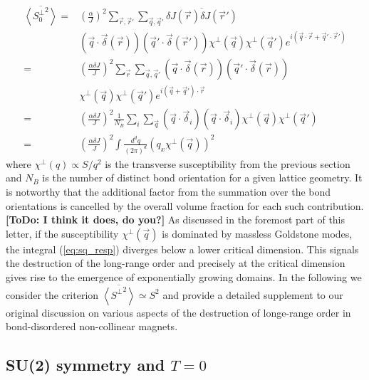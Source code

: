 \documentclass[twocolumn,english,aps,prl,floatfix]{revtex4-1}
\newcommand{\todo}[1]{{\color{red} {\bf [ToDo: #1]}}}
\begin{document}
\begin{equation}\label{eq:sq_resp}
    \begin{aligned}
        \overline{\left\langle {S_0^{\perp}}^2\right\rangle } =& 
        \left(\frac{\alpha}{J}\right)^2
        \sum_{\vec{r},\vec{r}'}\sum_{\vec{q},\vec{q}'}
        \overline{\delta J(\vec{r})\delta J(\vec{r}')} \\
        &(\vec{q}\cdot\vec{\delta}(\vec{r}))
        (\vec{q}'\cdot\vec{\delta}(\vec{r}'))
        \chi^\perp(\vec{q})\chi^\perp(\vec{q}') 
        e^{i\left(\vec{q}\cdot\vec{r}+\vec{q}'\cdot\vec{r}'\right)}\\
        =& \left(\frac{\alpha\delta J}{J}\right)^2
        \sum_{\vec{r}}\sum_{\vec{q},\vec{q}'}
        (\vec{q}\cdot\vec{\delta}(\vec{r}))
        (\vec{q}'\cdot\vec{\delta}(\vec{r})) \\
        & \chi^\perp(\vec{q})\chi^\perp(\vec{q}') 
        e^{i\left(\vec{q}+\vec{q}'\right)\cdot\vec{r}}\\
        =& \left(\frac{\alpha\delta J}{J}\right)^2
        \frac{1}{N_B}\sum_{i}\sum_{\vec{q}}
        (\vec{q}\cdot\vec{\delta}_i)
        (\vec{q}\cdot\vec{\delta}_i)
        \chi^\perp(\vec{q})\chi^\perp(\vec{q}') \\
        =&\left(\frac{\alpha\delta J}{J}\right)^2 \int 
        \frac{d^d q}{(2\pi)^d}\left(q_x 
        \chi^\perp(\vec q) \right)^2
    \end{aligned}
\end{equation}
where $\chi^\perp(q)\propto S/q^2$ is the transverse susceptibility 
from the previous section and $N_B$ is the number of distinct bond 
orientation for a given lattice geometry. It is notworthy that the 
additional factor from the summation over the bond orientations is 
cancelled by the overall volume fraction for each such contribution.
\todo{I think it does, do you?}
As discussed in the foremost part of this letter, if the susceptibility 
$\chi^\perp(\vec{q})$ is dominated by massless Goldstone modes, the 
integral (\ref{eq:sq_resp}) diverges below a lower critical dimension. 
This signals the destruction of the long-range order and precisely at 
the critical dimension gives rise to the emergence of exponentially 
growing domains. In the following we consider the criterion 
$ \overline{\left\langle {S^{\perp}}^2\right\rangle } \simeq S^2 $  
and provide a detailed supplement to our original discussion on 
various aspects of the destruction of longe-range order in 
bond-disordered non-collinear magnets.

\subsection{SU(2) symmetry and $T=0$}
\end{document}
